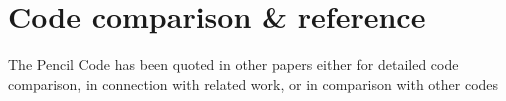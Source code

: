 \documentclass[12pt]{article}
\begin{document}
\section{Code comparison \& reference}

The {\sc Pencil Code} has been quoted in other papers either for
detailed code comparison, in connection with related work,
or in comparison with other codes \citep{
2021ApJ...919..107L,%
2021PhFl...33j7112Z,%
2021PhFl...33c5112S,%
2021arXiv210317238B,%
2021ApJ...907...43H,%
2021arXiv210108749B,%
2021ApJ...907...83V,%
2020zndo...3466444B,%
2020zndo...3961647A,%
2020arXiv200110665G,%
2020MNRAS.494.1180G,%
2020ApJ...892..106M,%
2020GApFD.114....1B,%
2020ApJ...898...60R,%
2019LRCA....5....2B,%
2019JPhCS1336a2012S,%
2019arXiv191113093R,%
2019ApJS..244...38M,%
2019MNRAS.488.5210T,%
2019ApJ...879...91J,%
2019ApJ...887..250P,%
2018arXiv181010861Z,%
}
\end{document}
